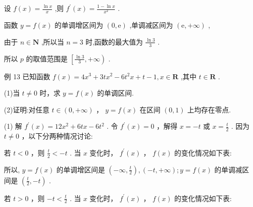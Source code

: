 \documentclass[10pt]{article}
\newcommand*\circled[1]{\tikz[baseline=(char.base)]{\node[shape=circle,draw,inner sep=1.5pt] (char) {\small #1};}}
\begin{document}
设 \(f\left( x\right)  = \frac{\ln x}{x}\) ,则 \({f}^{\prime }\left( x\right)  = \frac{1 - \ln x}{{x}^{2}}\) .

函数 \(y = f\left( x\right)\) 的单调增区间为 \(\left( {0,\mathrm{e}}\right)\) ,单调减区间为 \(\left( {\mathrm{e}, + \infty }\right)\) ,

由于 \(n \in  \mathbf{N}\) ,所以当 \(n = 3\) 时,函数的最大值为 \(\frac{\ln 3}{3}\) .

所以 \(p\) 的取值范围是 \(\left\lbrack  {\frac{\ln 3}{3}, + \infty }\right)\) .

例 13 已知函数 \(f\left( x\right)  = 4{x}^{3} + {3t}{x}^{2} - 6{t}^{2}x + t - 1,x \in  \mathbf{R}\) ,其中 \(t \in  \mathbf{R}\) .

(1)当 \(t \neq  0\) 时，求 \(y = f\left( x\right)\) 的单调区间.

(2)证明:对任意 \(t \in  \left( {0, + \infty }\right)\) ， \(y = f\left( x\right)\) 在区间 \(\left( {0,1}\right)\) 上均存在零点.

(1) 解 \({f}^{\prime }\left( x\right)  = {12}{x}^{2} + {6tx} - 6{t}^{2}\) . 令 \({f}^{\prime }\left( x\right)  = 0\) ，解得 \(x =  - t\) 或 \(x = \frac{t}{2}\) . 因为 \(t \neq  0\) ，以下分两种情况讨论:

 \circled{1} 若 \(t < 0\) ，则 \(\frac{t}{2} <  - t\) . 当 \(x\) 变化时， \({f}^{\prime }\left( x\right)\) ， \(f\left( x\right)\) 的变化情况如下表:

\begin{center}
\end{center}

所以, \(y = f\left( x\right)\) 的单调增区间是 \(\left( {-\infty ,\frac{t}{2}}\right) ,\left( {-t, + \infty }\right) ;y = f\left( x\right)\) 的单调减区间是 \(\left( {\frac{t}{2}, - t}\right)\) .

 \circled{2}  若 \(t > 0\) ，则 \(- t < \frac{t}{2}\) . 当 \(x\) 变化时， \({f}^{\prime }\left( x\right)\) ， \(f\left( x\right)\) 的变化情况如下表:

\begin{center}
\end{center}
\end{document}
